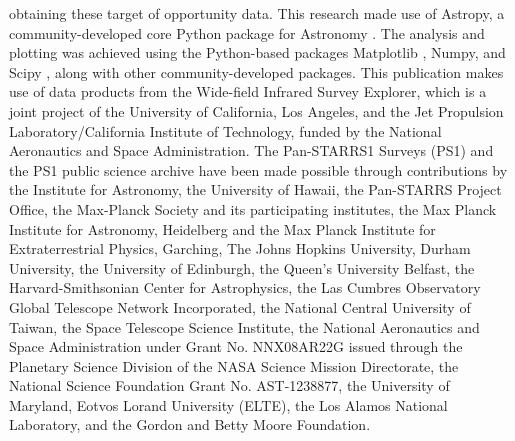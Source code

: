 \documentclass[longauth]{aa}    %
\begin{document}
\begin{acknowledgements}
obtaining these target of opportunity data.
%
This research made use of Astropy, a community-developed core Python package for
Astronomy \citep{TheAstropyCollaboration2013}. The analysis and plotting was
achieved using the Python-based packages Matplotlib \citep{Hunter2007}, Numpy,
and Scipy \citep{scipy, VanderWalt2011}, along with other community-developed
packages.
%
This publication makes use of data products from the Wide-field Infrared Survey Explorer, which is a joint project of the University of California, Los Angeles, and the Jet Propulsion Laboratory/California Institute of Technology, funded by the National Aeronautics and Space Administration.
%
The Pan-STARRS1 Surveys (PS1) and the PS1 public science archive have been made possible through contributions by the Institute for Astronomy, the University of Hawaii, the Pan-STARRS Project Office, the Max-Planck Society and its participating institutes, the Max Planck Institute for Astronomy, Heidelberg and the Max Planck Institute for Extraterrestrial Physics, Garching, The Johns Hopkins University, Durham University, the University of Edinburgh, the Queen's University Belfast, the Harvard-Smithsonian Center for Astrophysics, the Las Cumbres Observatory Global Telescope Network Incorporated, the National Central University of Taiwan, the Space Telescope Science Institute, the National Aeronautics and Space Administration under Grant No. NNX08AR22G issued through the Planetary Science Division of the NASA Science Mission Directorate, the National Science Foundation Grant No. AST-1238877, the University of Maryland, Eotvos Lorand University (ELTE), the Los Alamos National Laboratory, and the Gordon and Betty Moore Foundation.
%

\end{acknowledgements}

\newpage




\clearpage
\end{document}
